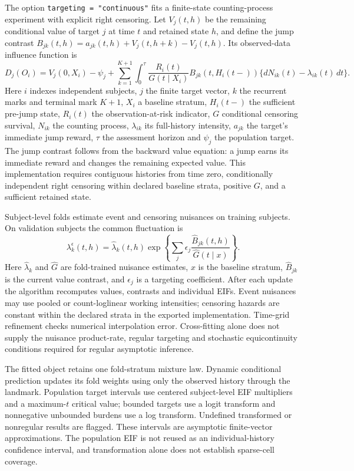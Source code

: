 \documentclass[article,nojss]{jss}
\newcommand{\code}[1]{\texttt{#1}}
\begin{document}
The option \code{targeting = "continuous"} fits a finite-state counting-process experiment with explicit right censoring. Let $V_j(t,h)$ be the remaining conditional value of target $j$ at time $t$ and retained state $h$, and define the jump contrast $B_{jk}(t,h)=a_{jk}(t,h)+V_j(t,h+k)-V_j(t,h)$. Its observed-data influence function is
\begin{equation}\label{eq:continuous_eif}
 D_j(O_i)=V_j(0,X_i)-\psi_j+
 \sum_{k=1}^{K+1}\int_0^\tau
 \frac{R_i(t)}{G(t\mid X_i)}B_{jk}(t,H_i(t-))
 \{dN_{ik}(t)-\lambda_{ik}(t)\,dt\}.
\end{equation}
Here $i$ indexes independent subjects, $j$ the finite target vector, $k$ the recurrent marks and terminal mark $K+1$, $X_i$ a baseline stratum, $H_i(t-)$ the sufficient pre-jump state, $R_i(t)$ the observation-at-risk indicator, $G$ conditional censoring survival, $N_{ik}$ the counting process, $\lambda_{ik}$ its full-history intensity, $a_{jk}$ the target's immediate jump reward, $\tau$ the assessment horizon and $\psi_j$ the population target. The jump contrast follows from the backward value equation: a jump earns its immediate reward and changes the remaining expected value. This implementation requires contiguous histories from time zero, conditionally independent right censoring within declared baseline strata, positive $G$, and a sufficient retained state.

Subject-level folds estimate event and censoring nuisances on training subjects. On validation subjects the common fluctuation is
\begin{equation}\label{eq:target_update}
 \lambda_k^{\epsilon}(t,h)=\widehat\lambda_k(t,h)
 \exp\!\left\{\sum_j\epsilon_j\frac{\widehat B_{jk}(t,h)}{\widehat G(t\mid x)}\right\}.
\end{equation}
Here $\widehat\lambda_k$ and $\widehat G$ are fold-trained nuisance estimates, $x$ is the baseline stratum, $\widehat B_{jk}$ is the current value contrast, and $\epsilon_j$ is a targeting coefficient. After each update the algorithm recomputes values, contrasts and individual EIFs. Event nuisances may use pooled or count-loglinear working intensities; censoring hazards are constant within the declared strata in the exported implementation. Time-grid refinement checks numerical interpolation error. Cross-fitting alone does not supply the nuisance product-rate, regular targeting and stochastic equicontinuity conditions required for regular asymptotic inference.

The fitted object retains one fold-stratum mixture law. Dynamic conditional prediction updates its fold weights using only the observed history through the landmark. Population target intervals use centered subject-level EIF multipliers and a maximum-$t$ critical value; bounded targets use a logit transform and nonnegative unbounded burdens use a log transform. Undefined transformed or nonregular results are flagged. These intervals are asymptotic finite-vector approximations. The population EIF is not reused as an individual-history confidence interval, and transformation alone does not establish sparse-cell coverage.
\end{document}
